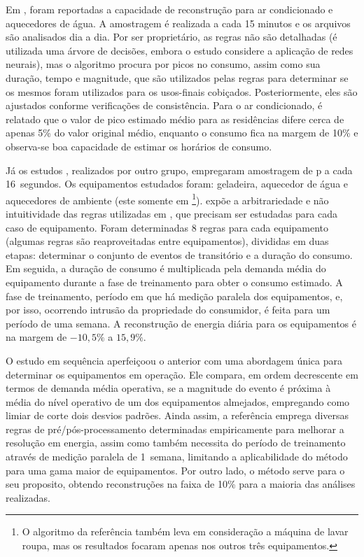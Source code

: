 \begin{enumerate}[label=\textbf{1.\arabic*},wide=\parindent]
\begin{enumerate}[label*=.\textbf{\arabic*},wide=\parindent]
Em \cite{nilm_powers_15minsamp_1991_16}, foram reportadas a capacidade
de reconstrução para ar condicionado e aquecedores de água. A
amostragem é realizada a cada 15 minutos e os arquivos são analisados
dia a dia. Por ser proprietário, as regras não são detalhadas (é
utilizada uma árvore de decisões, embora o estudo considere a aplicação
de redes neurais), mas o algoritmo procura por picos no consumo, assim
como sua duração, tempo e magnitude, que são utilizados pelas regras
para determinar se os mesmos foram utilizados para os usos-finais
cobiçados. Posteriormente, eles são ajustados conforme
verificações de consistência. Para o ar condicionado, é relatado que o
valor de pico estimado médio para as residências difere cerca de
apenas 5\% do valor original médio, enquanto o consumo fica na margem
de 10\% e observa-se boa capacidade de estimar os horários de consumo.
 
Já os estudos \cite{nilm_farinaccio_16ssamp_1999_17,
nilm_marceau_16ssamp_improved_1999_18}, realizados por outro
grupo, empregaram amostragem de \acs{p} a cada 16~segundos. Os
equipamentos estudados foram: geladeira, aquecedor de água e aquecedores
de ambiente (este somente em
\cite{nilm_marceau_16ssamp_improved_1999_18}\footnote{O algoritmo da
referência \cite{nilm_marceau_16ssamp_improved_1999_18}
também leva em consideração a máquina de lavar roupa, mas os
resultados focaram apenas nos outros três equipamentos.}).
\cite{nilm_zeifman_review_2011} expõe a arbitrariedade e não
intuitividade das regras utilizadas em
\cite{nilm_farinaccio_16ssamp_1999_17}, que precisam ser estudadas
para cada caso de equipamento. Foram determinadas 8 regras para cada
equipamento (algumas regras são reaproveitadas entre equipamentos),
divididas em duas etapas: determinar o conjunto de eventos de
transitório e a duração do consumo.  Em seguida, a duração de consumo é
multiplicada pela demanda média do equipamento durante a fase de
treinamento para obter o consumo estimado. A fase de treinamento,
período em que há medição paralela dos equipamentos, e, por isso,
ocorrendo intrusão da propriedade do consumidor, é feita para um
período de uma semana. A reconstrução de energia diária para os
equipamentos é na margem de $-10,5\%$ a $15,9\%$.

O estudo em sequência aperfeiçoou o anterior com uma abordagem única
para determinar os equipamentos em operação. Ele compara, em ordem
decrescente em termos de demanda média operativa, se a magnitude
do evento é próxima à média do nível operativo de um dos equipamentos
almejados, empregando como limiar de corte dois desvios padrões. Ainda
assim, a referência emprega diversas regras de pré/pós-processamento
determinadas empiricamente para melhorar a resolução em energia, assim
como também necessita do período de treinamento através de medição
paralela de 1~semana, limitando a aplicabilidade do método para uma
gama maior de equipamentos. Por outro lado, o método serve para o seu
proposito, obtendo reconstruções na faixa de 10\% para a maioria das
análises realizadas.


\end{enumerate}
\end{enumerate}
